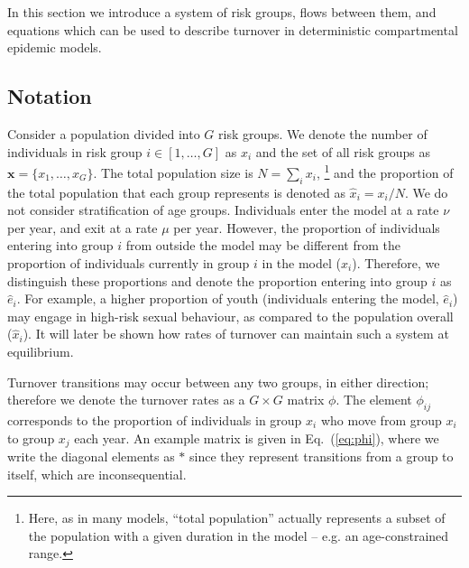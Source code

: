 In this section we introduce a system of
risk groups, flows between them, and equations
which can be used to describe turnover
in deterministic compartmental epidemic models.
\subsection{Notation}
Consider a population divided into $G$ risk groups.
We denote the number of individuals in risk group $i \in [1, \dots, G]$ as $x_i$
and the set of all risk groups as $\bm{x} = \{x_1, \dots, x_G\}$.
The total population size is $N = \sum_i {x_i}$,%
\footnote{Here, as in many models, ``total population'' actually represents
  a subset of the population with a given duration in the model --
  e.g. an age-constrained range.}
and the proportion of the total population that each group represents
is denoted as $\hat{x}_i = x_i / N$.
We do not consider stratification of age groups.
Individuals enter the model at a rate $\nu$ per year,
and exit at a rate $\mu$ per year.
However, the proportion of individuals entering into group $i$ from outside the model
may be different from
the proportion of individuals currently in group $i$ in the model ($\hat{x}_i$).
Therefore, we distinguish these proportions
and denote the proportion entering into group $i$ as $\hat{e}_i$.
For example, a higher proportion of youth (individuals entering the model, $\hat{e}_i$)
may engage in high-risk sexual behaviour,
as compared to the population overall ($\hat{x}_i$).
It will later be shown how rates of turnover can maintain such a system at equilibrium.
\par
Turnover transitions may occur between any two groups, in either direction;
therefore we denote the turnover rates as a $G \times G$ matrix $\phi$.
The element $\phi_{ij}$ corresponds to the proportion of individuals in group $x_i$
who move from group $x_i$ to group $x_j$ each year.
An example matrix is given in Eq.~(\ref{eq:phi}),
where we write the diagonal elements as $*$ since they represent
transitions from a group to itself, which are inconsequential.
